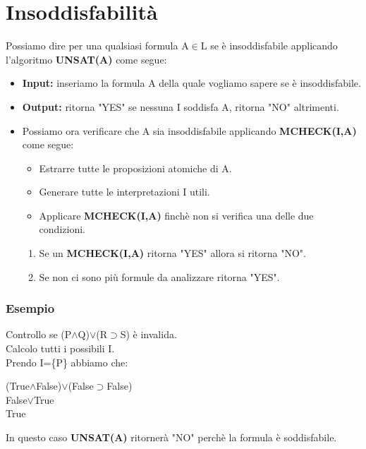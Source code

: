 \documentclass[../main.tex]{subfiles}
\begin{document}
    \section{Insoddisfabilità}
    Possiamo dire per una qualsiasi formula A$\in$L se è insoddisfabile applicando l'algoritmo \textbf{UNSAT(A)} come segue:
    \begin{itemize}
        \item \textbf{Input:} inseriamo la formula A della quale vogliamo sapere se è insoddisfabile.
        \item \textbf{Output:} ritorna "YES" se nessuna I soddisfa A, ritorna "NO" altrimenti.
        \item Possiamo ora verificare che A sia insoddisfabile applicando \textbf{MCHECK(I,A)} come segue:
        \begin{itemize}
            \item Estrarre tutte le proposizioni atomiche di A.
            \item Generare tutte le interpretazioni I utili.
            \item Applicare \textbf{MCHECK(I,A)} finchè non si verifica una delle due condizioni.
        \end{itemize}
        \begin{enumerate}
            \item Se un \textbf{MCHECK(I,A)} ritorna "YES" allora si ritorna "NO".
            \item Se non ci sono più formule da analizzare ritorna "YES".
        \end{enumerate}
    \end{itemize}

    \subsubsection{Esempio}
    Controllo se (P$\land$Q)$\lor$(R$\supset$S) è invalida.\\
    Calcolo tutti i possibili I.\\
    Prendo I=\{P\} abbiamo che:
    \begin{center}
        (True$\land$False)$\lor$(False$\supset$False)\\
        False$\lor$True\\
        True
    \end{center}
    In questo caso \textbf{UNSAT(A)} ritornerà "NO" perchè la formula è soddisfabile.
\end{document}

